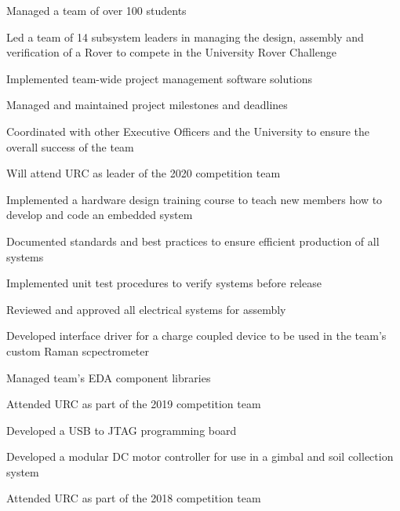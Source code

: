 \documentclass[]{deedy-resume-reversed}
\begin{document}
\begin{minipage}[t]{0.66\textwidth}
\begin{tightemize}
	\item Managed a team of over 100 students
	\item Led a team of 14 subsystem leaders in managing the design, assembly and verification of a Rover to compete in the University Rover Challenge
	\item Implemented team-wide project management software solutions
	\item Managed and maintained project milestones and deadlines
	\item Coordinated with other Executive Officers and the University to ensure the overall success of the team
	\item Will attend URC as leader of the 2020 competition team
\end{tightemize}
\begin{tightemize}
	\item Implemented a hardware design training course to teach new members how to develop and code an embedded system
	\item Documented standards and best practices to ensure efficient production of all systems
	\item Implemented unit test procedures to verify systems before release
	\item Reviewed and approved all electrical systems for assembly
	\item Developed interface driver for a charge coupled device to be used in the team's custom Raman scpectrometer
	\item Managed team's EDA component libraries
	\item Attended URC as part of the 2019 competition team
\end{tightemize}
\begin{tightemize}
	\item Developed a USB to JTAG programming board
	\item Developed a modular DC motor controller for use in a gimbal and soil collection system
	\item Attended URC as part of the 2018 competition team
\end{tightemize}
\sectionsep


\end{minipage}
\end{document}
